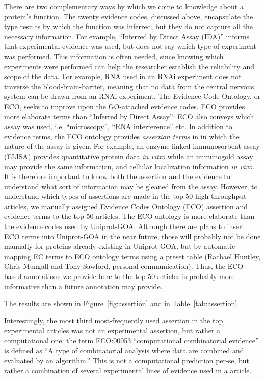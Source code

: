 \documentclass[12pt]{article}
\begin{document}
There are two complementary ways by which we come to knowledge about a protein's function.
The twenty evidence codes, discussed above, encapsulate the type results by which the
function was inferred, but they do not capture all the necessary information. For example,
``Inferred by Direct Assay (IDA)'' informs that experimental evidence was used, but does
not say which type of experiment was performed.  This information is often needed, since
knowing which experiments were performed can help the researcher establish the reliability
and scope of the data. For example, RNA used in an  RNAi experiment does not traverse the
blood-brain-barrier, meaning that no data from the central nervous system can be drawn from
an RNAi experiment. The Evidence Code Ontology, or ECO, seeks to improve upon the
GO-attached evidence codes. ECO provides more elaborate terms than ``Inferred by Direct
Assay'': ECO also conveys which assay was used, i.e.  ``microscopy'', ``RNA interference''
etc.  In addition to evidence terms, the ECO ontology provides \textit{assertion terms} in
in which the nature of the assay is given. For example, an enzyme-linked immunosorbent
assay (ELISA) provides quantitative protein data \textit{in vitro} while an immunogold
assay may provide the same information, and cellular localization information \textit{in
vivo}. It is therefore important to know both the assertion and the evidence to understand
what sort of information may be gleaned from the assay. However, to understand which types
of assertions are made in the top-50 high throughput articles, we manually assigned
Evidence Codes Ontology (ECO) assertion and evidence terms to the top-50 articles. The ECO
ontology is more elaborate than the evidence codes used by Uniprot-GOA.  Although there are
plans to insert ECO terms into Uniprot-GOA in the near future, those will probably not be
done manually for proteins already existing in Uniprot-GOA, but by automatic mapping EC
terms to ECO ontology terms using a preset table (Rachael Huntley, Chris Mungall  and Tony
Sawford, personal communication). Thus, the ECO-based annotations we provide here to the
top 50 articles is probably more informative than a future annotation may provide.

The results are shown in Figure~\ref{fig:assertion} and in
Table~\ref{tab:assertion}.

Interestingly, the most third most-frequently used assertion in the top experimental
articles was not an experimental assertion, but rather a computational one: the term
ECO:00053 ``computational combinatorial evidence'' is defined as ``A type of combinatorial
analysis where data are combined and evaluated by an algorithm.'' This is not a
computational prediction per-se, but rather a combination of several experimental lines of
evidence used in a article.
\end{document}
